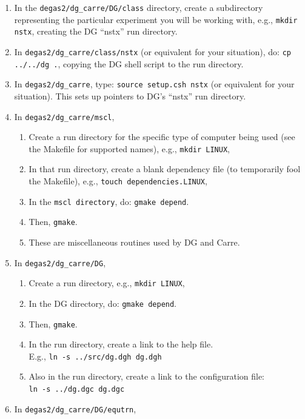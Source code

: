 \documentclass[12pt]{report}
\begin{document}
\begin{enumerate}
  \item In the
\verb+degas2/dg_carre/DG/class+ directory, create a subdirectory
representing the particular experiment you will be working with,
e.g., \verb+mkdir nstx+, creating the DG ``nstx'' run directory.
  \item In \verb+degas2/dg_carre/class/nstx+ (or equivalent
for your situation), do: \verb+cp ../../dg .+, copying the DG
shell script to the run directory.
  \item In \verb+degas2/dg_carre+, type: 
\verb+source setup.csh nstx+ (or equivalent for your
situation).  This sets up pointers
to DG's ``nstx'' run directory.
   \item In \verb+degas2/dg_carre/mscl+, 
   \begin{enumerate}
        \item Create a run directory for the
specific type of computer being used (see the Makefile
for supported names), e.g., \verb+mkdir LINUX+,
        \item In that run directory, create a blank dependency file (to 
          temporarily fool the Makefile), e.g., 
\verb+touch dependencies.LINUX+,
        \item In the \verb+mscl directory+, do: 
\verb+gmake depend+.
        \item Then, \verb+gmake+.
        \item These are miscellaneous routines used by DG and Carre.
   \end{enumerate}
   \item In \verb+degas2/dg_carre/DG+,
   \begin{enumerate}
        \item Create a run directory, e.g., \verb+mkdir LINUX+,
        \item In the DG directory, do: \verb+gmake depend+.
        \item Then, \verb+gmake+.
        \item In the run directory, create a link to the help file. \\  
E.g.,
\verb+ln -s ../src/dg.dgh dg.dgh+
        \item Also in the run directory, create a link to the configuration
          file: \\
\verb+ln -s ../dg.dgc dg.dgc+
   \end{enumerate}
   \item In \verb+degas2/dg_carre/DG/equtrn+,
   \begin{enumerate}

\end{enumerate}
\end{enumerate}
\end{document}
